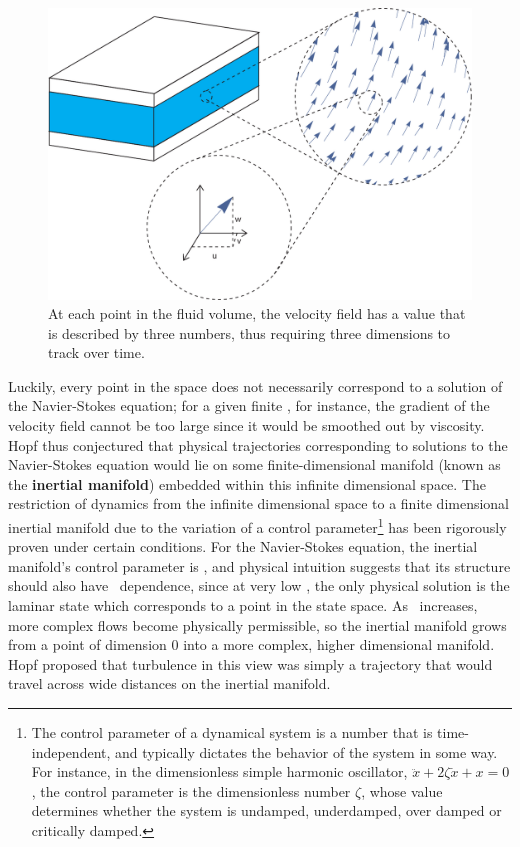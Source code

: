 \begin{figure}
\centerline{
\includegraphics[scale=0.6]{Figs/VectorSpace}}
\caption{At each point in the fluid volume, the velocity field has a value that is described by three numbers, thus requiring three dimensions to track over time.}\label{fig:VectorSpace}
\end{figure}


Luckily, every point in the space does not necessarily correspond to a solution of the Navier-Stokes equation; for a given finite \ReN, for instance, the gradient of the velocity field cannot be too large since it would be smoothed out by viscosity. Hopf thus conjectured that physical trajectories corresponding to solutions to the Navier-Stokes equation would lie on some finite-dimensional manifold (known as the {\bf inertial manifold}) embedded within this infinite dimensional space. The restriction of dynamics from the infinite dimensional space to a finite dimensional inertial manifold due to the variation of a control parameter\footnote{The control parameter of a dynamical system is a number that is time-independent, and typically dictates the behavior of the system in some way. For instance, in the dimensionless simple harmonic oscillator, $\ddot{x} + 2\zeta \dot{x} + x = 0$, the control parameter is the dimensionless number $\zeta$, whose value determines whether the system is undamped, underdamped, over damped or critically damped.} has been rigorously proven under certain conditions. For the Navier-Stokes equation, the inertial manifold's control parameter is \ReN, and physical intuition suggests that its structure should also have \ReN~dependence, since at very low \ReN, the only physical solution is the laminar state which corresponds to a point in the state space. As \ReN\ increases, more complex flows become physically permissible, so the inertial manifold grows from a point of dimension 0 into a more complex, higher dimensional manifold. Hopf proposed that turbulence in this view was simply a trajectory that would travel across wide distances on the inertial manifold. \\


